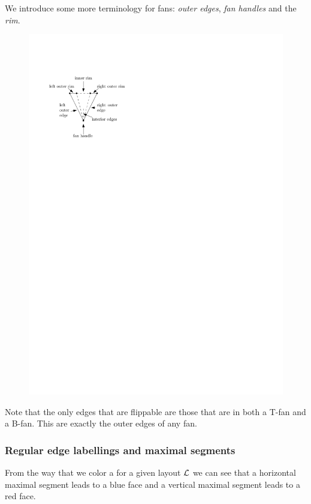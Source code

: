    We introduce some more terminology for fans: \emph{outer edges}, \emph{fan handles} and the \emph{rim}.
   \begin{figure}[h]
     \centering
     \includegraphics[scale=1]{rectangularDuals/img/fanterms}
     \caption{}
     \label{fig:}
   \end{figure}

   Note that the only edges that are flippable are those that are in both a T-fan and a B-fan. This are exactly the outer edges of any fan.

  \subsubsection{Regular edge labellings and maximal segments}
    From the way that we color a \rel for a given layout $\mathcal{L}$ we can see that a horizontal maximal segment leads to a blue face and a vertical maximal segment leads to a red face.

